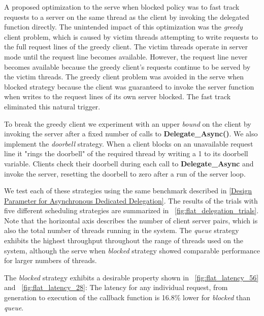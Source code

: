 \documentclass{uicthesi}
\newcounter{problem}
\begin{document}
A proposed optimization to the serve when blocked policy was to fast track requests to a server on the same thread as the client by invoking the delegated function directly. The unintended impact of this optimization was the \textit{greedy} client problem, which is caused by victim threads attempting to write requests to the full request lines of the greedy client. The victim threads operate in server mode until the request line becomes available. However, the request line never becomes available because the greedy client's requests continue to be served by the victim threads. The greedy client problem was avoided in the serve when blocked strategy because the client was guaranteed to invoke the server function when writes to the request lines of its own server blocked. The fast track eliminated this natural trigger. 

To break the greedy client we experiment with an upper \textit{bound} on the client by invoking the server after a fixed number of calls to \textbf{Delegate\_Async()}. We also implement the \textit{doorbell} strategy. When a client blocks on an unavailable request line it "rings the doorbell" of the required thread by writing a 1 to its doorbell variable. Clients check their doorbell during each call to \textbf{Delegate\_Async} and invoke the server, resetting the doorbell to zero after a run of the server loop.

We test each of these strategies using the same benchmark described in \ref{Design Parameter for Asynchronous Dedicated Delegation}. The results of the trials with five different scheduling strategies are summarized in ~\ref{fig:flat_delegation_trials}. Note that the horizontal axis describes the number of client server pairs, which is also the total number of threads running in the system. The \textit{queue} strategy exhibits the highest throughput throughout the range of threads used on the system, although the serve when \textit{blocked} strategy showed comparable performance for larger numbers of threads. 

The \textit{blocked} strategy exhibits a desirable property shown in ~\ref{fig:flat_latency_56} and ~\ref{fig:flat_latency_28}: The latency for any individual request, from generation to execution of the callback function is 16.8\% lower for \textit{blocked} than \textit{queue}. 
\end{document}
